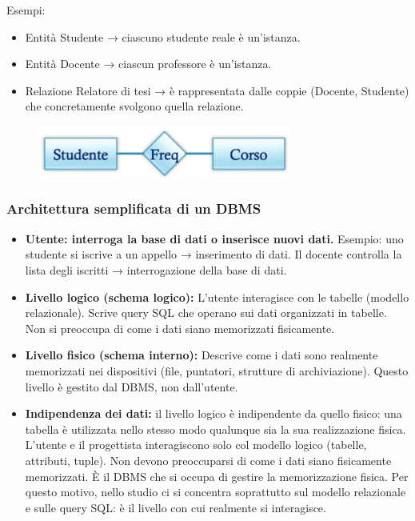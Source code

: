 \documentclass{article}
\begin{document}
Esempi:\begin{itemize}
    \item Entità Studente → ciascuno studente reale è un'istanza.
    \item Entità Docente → ciascun professore è un'istanza.
    \item Relazione Relatore di tesi → è rappresentata dalle coppie (Docente, Studente) che concretamente svolgono quella relazione.
\end{itemize}
\begin{figure}[h!]
    \centering
    \includegraphics[width=0.25\linewidth]{er.png}
\end{figure}

\subsubsection{Architettura semplificata di un DBMS}
\begin{itemize}
    \item \textbf{Utente: interroga la base di dati o inserisce nuovi dati.}
 Esempio: uno studente si iscrive a un appello → inserimento di dati. Il docente controlla la lista degli iscritti → interrogazione della base di dati.

\item \textbf{Livello logico (schema logico):}
L’utente interagisce con le tabelle (modello relazionale). Scrive query SQL che operano sui dati organizzati in tabelle. Non si preoccupa di come i dati siano memorizzati fisicamente.

\item\textbf{Livello fisico (schema interno):} Descrive come i dati sono realmente memorizzati nei dispositivi (file, puntatori, strutture di archiviazione). Questo livello è gestito dal DBMS, non dall’utente.

\item \textbf{Indipendenza dei dati:} il livello logico è indipendente da quello fisico: una tabella è utilizzata nello stesso modo qualunque sia la sua realizzazione fisica. L’utente e il progettista interagiscono solo col modello logico (tabelle, attributi, tuple). Non devono preoccuparsi di come i dati siano fisicamente memorizzati. È il DBMS che si occupa di gestire la memorizzazione fisica. Per questo motivo, nello studio ci si concentra soprattutto sul modello relazionale e sulle query SQL: è il livello con cui realmente si interagisce.
\end{itemize}
\end{document}
